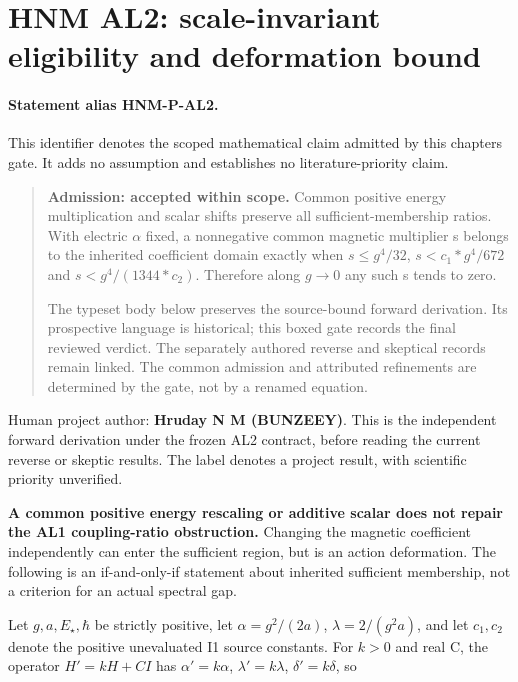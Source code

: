 \hypertarget{r29-al2-al2-forward-hnm-scale-invariant-eligibility-and-deformation-bound}{%
\section{HNM AL2: scale-invariant eligibility and deformation bound\workstar}\label{r29:al2:r29-al2-al2-forward-hnm-scale-invariant-eligibility-and-deformation-bound}}
\paragraph{Statement alias HNM-P-AL2.}\label{stmt:AL2} This identifier denotes the scoped mathematical claim admitted by this chapter\textquotesingle s gate. It adds no assumption and establishes no literature-priority claim.

\begin{quote}\small \textbf{Admission: accepted within scope.} Common positive energy multiplication and scalar shifts preserve all sufficient-membership ratios. With electric \(\alpha\) fixed, a nonnegative common magnetic multiplier s belongs to the inherited coefficient domain exactly when \(s\le g^{4}/32\), \(s<c_1*g^{4}/672\) and \(s<g^{4}/(1344*c_2)\). Therefore along \(g\to 0\) any such s tends to zero.\par The typeset body below preserves the source-bound forward derivation. Its prospective language is historical; this boxed gate records the final reviewed verdict. The separately authored reverse and skeptical records remain linked. The common admission and attributed refinements are determined by the gate, not by a renamed equation.\end{quote}
Human project author: \textbf{Hruday N M (BUNZEEY)}. This is the independent forward derivation under the frozen AL2 contract, before reading the current reverse or skeptic results. The label denotes a project result, with scientific priority unverified.

\textbf{A common positive energy rescaling or additive scalar does not repair the AL1 coupling-ratio obstruction.} Changing the magnetic coefficient independently can enter the sufficient region, but is an action deformation. The following is an if-and-only-if statement about inherited sufficient membership, not a criterion for an actual spectral gap.

Let \(g,a,E_\star,\hbar\) be strictly positive, let \(\alpha=g^{2}/(2a)\), \(\lambda=2/(g^{2}a)\), and let \(c_1,c_2\) denote the positive unevaluated I1 source constants. For \(k>0\) and real C, the operator \(H'=kH+CI\) has \(\alpha'=k\alpha\), \(\lambda'=k\lambda\), \(\delta'=k\delta\), so

